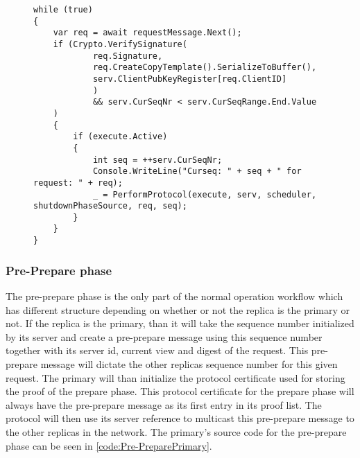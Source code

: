 \begin{figure}[H]
	\centering
	\begin{lstlisting}[label = code:StartProtocol, caption=Code section from the request handler, captionpos = b, basicstyle=\scriptsize]
while (true)
{
    var req = await requestMessage.Next();
    if (Crypto.VerifySignature(
        	req.Signature, 
            req.CreateCopyTemplate().SerializeToBuffer(), 
            serv.ClientPubKeyRegister[req.ClientID]
            ) 
            && serv.CurSeqNr < serv.CurSeqRange.End.Value
    )
    {
        if (execute.Active)
        {
            int seq = ++serv.CurSeqNr;
            Console.WriteLine("Curseq: " + seq + " for request: " + req);
            _ = PerformProtocol(execute, serv, scheduler, shutdownPhaseSource, req, seq);
        }
    }
}
	\end{lstlisting}
\end{figure}

\subsubsection{Pre-Prepare phase}
The pre-prepare phase is the only part of the normal operation workflow which has different structure depending on whether or not the replica is the primary or not. If the replica is the primary, than it will take the sequence number initialized by its server and create a pre-prepare message using this sequence number together with its server id, current view and digest of the request. This pre-prepare message will dictate the other replicas sequence number for this given request. The primary will than initialize the protocol certificate used for storing the proof of the prepare phase. This protocol certificate for the prepare phase will always have the pre-prepare message as its first entry in its proof list. The protocol will then use its server reference to multicast this pre-prepare message to the other replicas in the network. The primary's source code for the pre-prepare phase can be seen in \autoref{code:Pre-PreparePrimary}.

